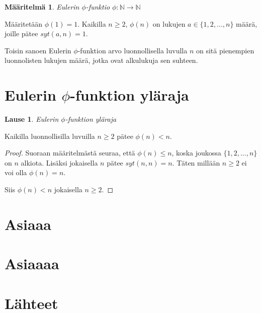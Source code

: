 \documentclass{article}
\theoremstyle{definition}
\newtheorem{maaritelma}[subsection]{Määritelmä}
\newtheorem{lause}[subsection]{Lause}
\begin{document}
\begin{maaritelma}{\emph{Eulerin $\phi$-funktio $\phi: \mathbb{N} \rightarrow \mathbb{N}$}}

Määritetään $\phi(1) = 1$. Kaikilla $n \geq 2$, $\phi(n)$ on lukujen $a \in \{1,2,...,n\}$ määrä, joille pätee $syt(a,n) = 1$.

Toisin sanoen Eulerin $\phi$-funktion arvo luonnollisella luvulla $n$ on sitä pienempien luonnolisten lukujen määrä, jotka ovat alkulukuja sen suhteen.

\end{maaritelma}

\section{Eulerin $\phi$-funktion yläraja}

\begin{lause}{\emph{Eulerin $\phi$-funktion yläraja}}

Kaikilla luonnollisilla luvuilla $n \geq 2$ pätee $\phi(n) < n$.

\begin{proof}

Suoraan määritelmästä seuraa, että $\phi(n) \leq n$, koska joukossa $\{1,2,...,n\}$ on $n$ alkiota. Lisäksi jokaisella $n$ pätee $syt(n,n) = n$. Täten millään $n \geq 2$ ei voi olla $\phi(n) = n$.

Siis $\phi(n) < n$ jokaisella $n \geq 2$.

\end{proof}

\end{lause}

\section{Asiaaa}

\section{Asiaaaa}

\section{Lähteet}

\printbibliography[heading=none]
\end{document}
